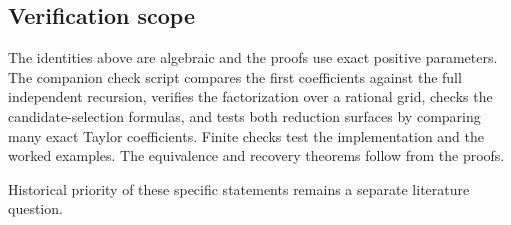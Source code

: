\hypertarget{v11-coupled_inverse_full-verification-scope}{%
\subsection{Verification scope}\label{v11-coupled_inverse_full-verification-scope}}

The identities above are algebraic and the proofs use exact positive
parameters. The companion check script compares the first coefficients
against the full independent recursion, verifies the factorization over
a rational grid, checks the candidate-selection formulas, and tests both
reduction surfaces by comparing many exact Taylor coefficients. Finite
checks test the implementation and the worked examples. The equivalence
and recovery theorems follow from the proofs.

Historical priority of these specific statements remains a separate
literature question.
